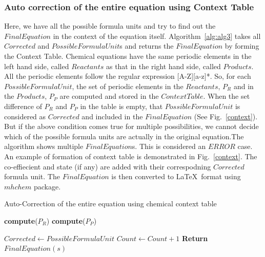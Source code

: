 \subsubsection{Auto correction of the entire equation using Context Table}
Here, we have all the possible formula units and try to find out the $FinalEquation$ in the context of the equation itself. Algorithm~\ref{alg:alg3} takes all $Corrected$ and $PossibleFormulaUnit$s and returns the $FinalEquation$ by forming the Context Table. 
Chemical equations have the same periodic elements in the left hand side, called $Reactants$ as that in the right hand side, called $Products$. All the periodic elements follow the regular expression [A-Z][a-z]*. So, for each  $PossibleFormulaUnit$, the set of periodic elements in the $Reactants$, $P_{R}$ and in the $Products$, $P_{P}$ are computed and stored in the $Context Table$. When the set difference of $P_{R}$ and $P_{P}$ in the table is empty, that $PossibleFormulaUnit$ is considered as $Corrected$ and included in the $FinalEquation$ (See Fig.~\ref{context}). But if the above condition comes true for multiple possibilities, we cannot decide which of the possible formula units are actually in the original equation.The algorithm shows multiple $FinalEquation$s. This is considered an $ERROR$ case.
An example of formation of context table is demonstrated in  Fig.~\ref{context}. The co-effiecient and state (if any) are added with their correspodning $Corrected$ formula unit. The $FinalEquation$ is then converted to \LaTeX\  format using $mhchem$ package.

\begin{algorithm}
\small
\caption{Auto-Correction of the entire equation using chemical context table}
\begin{algorithmic}[1]
		\State \textbf{compute}($P_{R}$)  
		\Statex {}
		\State \textbf{compute}($P_{P}$)  \
		\Statex {}
		
			\State $Corrected \leftarrow PossibleFormulaUnit$
			\State $Count \leftarrow Count + 1$
		\EndIf
	\EndFor
		\Statex {}
	\EndIf
	\State  \textbf{Return} {$FinalEquation(s)$}
\EndProcedure
\end{algorithmic}
\label{alg:alg3}
\end{algorithm}

